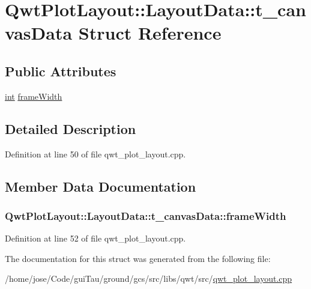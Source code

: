 \hypertarget{struct_qwt_plot_layout_1_1_layout_data_1_1t__canvas_data}{\section{Qwt\-Plot\-Layout\-:\-:Layout\-Data\-:\-:t\-\_\-canvas\-Data Struct Reference}
\label{struct_qwt_plot_layout_1_1_layout_data_1_1t__canvas_data}
}
\subsection*{Public Attributes}
\begin{DoxyCompactItemize}
\item 
\hyperlink{ioapi_8h_a787fa3cf048117ba7123753c1e74fcd6}{int} \hyperlink{struct_qwt_plot_layout_1_1_layout_data_1_1t__canvas_data_a65db692568f44776756c47d072c72c17}{frame\-Width}
\end{DoxyCompactItemize}


\subsection{Detailed Description}


Definition at line 50 of file qwt\-\_\-plot\-\_\-layout.\-cpp.



\subsection{Member Data Documentation}
\hypertarget{struct_qwt_plot_layout_1_1_layout_data_1_1t__canvas_data_a65db692568f44776756c47d072c72c17}{
\subsubsection[{frame\-Width}]{ Qwt\-Plot\-Layout\-::\-Layout\-Data\-::t\-\_\-canvas\-Data\-::frame\-Width}}\label{struct_qwt_plot_layout_1_1_layout_data_1_1t__canvas_data_a65db692568f44776756c47d072c72c17}


Definition at line 52 of file qwt\-\_\-plot\-\_\-layout.\-cpp.



The documentation for this struct was generated from the following file\-:\begin{DoxyCompactItemize}
\item 
/home/jose/\-Code/gui\-Tau/ground/gcs/src/libs/qwt/src/\hyperlink{qwt__plot__layout_8cpp}{qwt\-\_\-plot\-\_\-layout.\-cpp}\end{DoxyCompactItemize}
